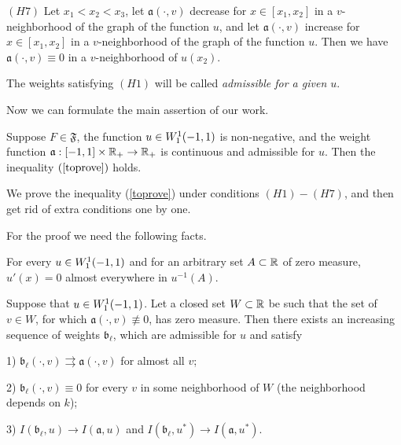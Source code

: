 \bigskip
\noindent
$(H7)$ Let $x_1 < x_2 < x_3$,
let $\mathfrak a(\cdot, v)$ decrease for $x \in [x_1, x_2]$ in a $v$-neighborhood of the graph of the function $u$,
and let $\mathfrak a(\cdot, v)$ increase for $x \in [x_1, x_2]$ in a $v$-neighborhood of the graph of the function $u$.
Then we have $\mathfrak a(\cdot, v) \equiv 0$ in a $v$-neighborhood of $u(x_2)$.

\bigskip

The weights satisfying $(H1)$ will be called {\it admissible for a given $u$}.

\medskip

Now we can formulate the main assertion of our work.
\begin{thm}
\label{mainThm}
Suppose $F \in \mathfrak{F}$, the function $u \in W_1^1(-1, 1)$ is non-negative,
and the weight function $\mathfrak a: [-1, 1] \times \mathbb R_+ \to \mathbb R_+$ is continuous
and admissible for $u$.
Then the inequality $(\ref{toprove})$ holds.
\end{thm}

We prove the inequality (\ref{toprove}) under conditions $(H1)-(H7)$,
and then get rid of extra conditions one by one.

For the proof we need the following facts.

\begin{prop}
\label{levelDerivative}
{\rm \cite[Theorem 6.19]{LL} }
For every $u \in W_1^1(-1, 1)$ and for an arbitrary set $A \subset \mathbb R$ of zero measure,
$u'(x) = 0$ almost everywhere in $u^{-1}(A)$.
\end{prop}

\begin{lm}
\label{zeroApprox}
Suppose that $u \in W_1^1(-1, 1)$.
Let a closed set $W \subset \mathbb R$ be such that
the set of $v \in W$, for which $\mathfrak a(\cdot, v) \not\equiv 0$, has zero measure.
Then there exists an increasing sequence of weights $\mathfrak b_{\ell}$, which are admissible for $u$ and satisfy

1) $\mathfrak b_{\ell}(\cdot, v) \rightrightarrows \mathfrak a(\cdot, v)$ for almost all $v$;

2) $\mathfrak b_{\ell}(\cdot, v) \equiv 0$ for every $v$ in some neighborhood of $W$ (the neighborhood depends on $k$);

3) $I(\mathfrak b_{\ell}, u) \to I(\mathfrak a, u)$ and $I(\mathfrak b_{\ell}, u^*) \to I(\mathfrak a, u^*)$.
\end{lm}

